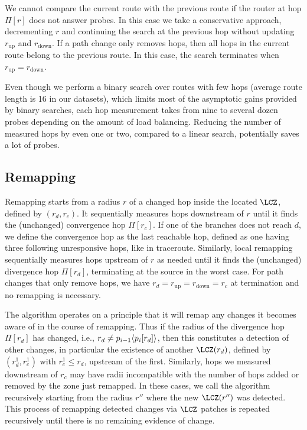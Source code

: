 We cannot compare the current route with the previous route if the
router at hop $\Pi[r]$ does not answer probes.  In this case we take a
conservative approach, decrementing $r$ and continuing the search at the
previous hop without updating $r_\mathrm{up}$ and $r_\mathrm{down}$.  If
a path change only removes hops, then all hops in the current route
belong to the previous route.  In this case, the search terminates when
$r_\mathrm{up} = r_\mathrm{down}$.

Even though we perform a binary search over routes with few hops
(average route length is 16 in our datasets), which limits most of the
asymptotic gains provided by binary searches, each hop measurement takes
from nine to several dozen probes depending on the amount of load
balancing.  Reducing the number of measured hops by even one or two,
compared to a linear search, potentially saves a lot of probes.


\subsection{Remapping}
\label{sec:remap.local}

Remapping starts from a radius $r$ of a changed hop inside the located
$\LCZ$, defined by $(r_d,r_c)$.  It sequentially measures hops
downstream of $r$ until it finds the (unchanged) convergence hop
$\Pi[r_c]$.  If one of the branches does not reach $d$, we define the
convergence hop as the last reachable hop, defined as one having three
following unresponsive hops, like in traceroute.  Similarly, local
remapping sequentially measures hops upstream of $r$ as needed until it
finds the (unchanged) divergence hop $\Pi[r_d]$,  terminating at the
source in the worst case.    For path changes that only remove hops, we
have $r_d = r_\mathrm{up} = r_\mathrm{down}=r_c$ at termination and no
remapping is necessary.

The algorithm operates on a principle that it will remap any changes it
becomes aware of in the course of remapping.  Thus if the radius of the
divergence hop $\Pi[r_d]$ has changed, i.e., $r_d \ne p_{i-1}\langle
p_i[r_d]\rangle$, then this constitutes a detection of other changes, in
particular the existence of another $\LCZ(r_d)$, defined by
$(r_d^1,r_c^1)$ with $r_c^1\le r_d$, upstream of the first.  Similarly,
hops we measured downstream of $r_c$ may have radii incompatible with
the number of hops added or removed by the zone just remapped.  In these
cases, we call the algorithm recursively starting from the radius $r''$
where the new $\LCZ(r'')$ was detected.  This process of remapping
detected changes via $\LCZ$ patches is repeated recursively until there
is no remaining evidence of change.

